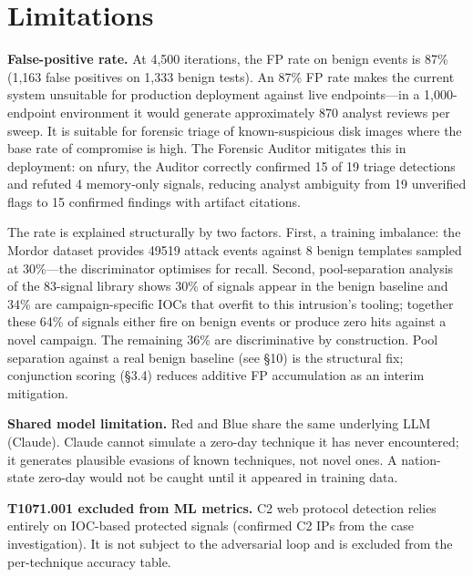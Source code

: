 \documentclass[sigconf, nonacm]{acmart}
\begin{document}
\section{Limitations}

\textbf{False-positive rate.} At 4,500 iterations, the FP rate on
benign events is 87\% (1,163 false positives on 1,333 benign tests).
An 87\% FP rate makes the current system unsuitable for production
deployment against live endpoints—in a 1,000-endpoint environment it
would generate approximately 870 analyst reviews per sweep. It is
suitable for forensic triage of known-suspicious disk images where the
base rate of compromise is high. The Forensic Auditor mitigates this in
deployment: on nfury, the Auditor correctly confirmed 15 of 19 triage
detections and refuted 4 memory-only signals, reducing analyst
ambiguity from 19 unverified flags to 15 confirmed findings with
artifact citations.

The rate is explained structurally by two factors. First, a training
imbalance: the Mordor dataset provides \num{49519} attack events
against 8 benign templates sampled at 30\%---the discriminator
optimises for recall. Second, pool-separation analysis of the
83-signal library shows 30\% of signals appear in the benign baseline
and 34\% are campaign-specific IOCs that overfit to this intrusion's
tooling; together these 64\% of signals either fire on benign events
or produce zero hits against a novel campaign. The remaining 36\% are
discriminative by construction. Pool separation against a real benign
baseline (see §10) is the structural fix; conjunction scoring (§3.4)
reduces additive FP accumulation as an interim mitigation.

\textbf{Shared model limitation.} Red and Blue share the same
underlying LLM (Claude). Claude cannot simulate a zero-day technique
it has never encountered; it generates plausible evasions of known
techniques, not novel ones. A nation-state zero-day would not be
caught until it appeared in training data.

\textbf{T1071.001 excluded from ML metrics.} C2 web protocol detection
relies entirely on IOC-based protected signals (confirmed C2 IPs from
the case investigation). It is not subject to the adversarial loop and
is excluded from the per-technique accuracy table.
\end{document}
